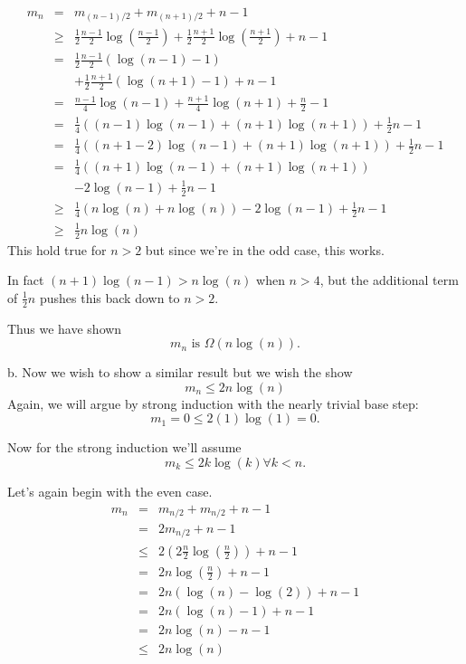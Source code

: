 \documentclass[16 pt]{amsart}
\theoremstyle{definition}
\theoremstyle{remark}
\numberwithin{equation}{subsection}
\newcommand{\half}{\frac{1}{2}}
\begin{document}
\begin{eqnarray*}
m_n & = & m_{(n-1)/2} + m_{(n+1)/2} + n-1\\
    & \geq & \half \frac{n-1}{2}\log\left(\frac{n-1}{2}\right) + \half \frac{n+1}{2}\log\left(\frac{n+1}{2}\right) + n-1\\
    & = & \half \frac{n-1}{2}(\log(n-1)-1)\\
    &   & + \half \frac{n+1}{2}(\log(n+1)-1)+n-1\\
    & = & \frac{n-1}{4}\log(n-1) + \frac{n+1}{4}\log(n+1) +\frac{n}{2}-1\\
    & = & \frac{1}{4}\left((n-1)\log(n-1)+(n+1)\log(n+1)\right)+ \half n-1\\
    & = & \frac{1}{4}\left((n+1-2)\log(n-1)+(n+1)\log(n+1)\right)+\half n-1\\
    & = & \frac{1}{4}\left((n+1)\log(n-1)+(n+1)\log(n+1)\right)\\
    & & -2\log(n-1)+\half n-1\\
    & \geq &  \frac{1}{4}\left(n\log(n)+n\log(n)\right)-2\log(n-1) + \half n-1\\
    & \geq & \half n\log(n)
\end{eqnarray*}
This hold true for $n>2$ but since we're in the odd case, this works.

In fact $(n+1)\log(n-1) > n\log(n)$ when $n>4$, but the additional term of $\half n$ pushes this back down to $n>2$.  



Thus we have shown
\[
m_n \text{ is } \Omega(n\log(n)).
\]
\vspace{1in}

b. Now we wish to show a similar result but we wish the show
\[
m_n \leq 2n\log(n)
\]
Again, we will argue by strong induction with the nearly trivial base step:
\[
m_1=0 \leq 2(1)\log(1)=0.
\]

Now for the strong induction we'll assume
\[
m_k \leq 2k\log(k) \forall k<n.
\]

Let's again begin with the even case.
\begin{eqnarray*}
m_n & = & m_{n/2} + m_{n/2} + n-1\\
    & = & 2 m_{n/2} + n-1\\
    & \leq & 2(2\frac{n}{2}\log\left(\frac{n}{2}\right)) + n-1\\
    & = & 2n \log\left(\frac{n}{2}\right) + n-1\\
    & = & 2n (\log(n)-\log(2))+n-1\\
    & = & 2n(\log(n)-1)+n-1\\
    & = & 2n\log(n) -n - 1 \\
    & \leq & 2n \log(n)
\end{eqnarray*}
\end{document}
